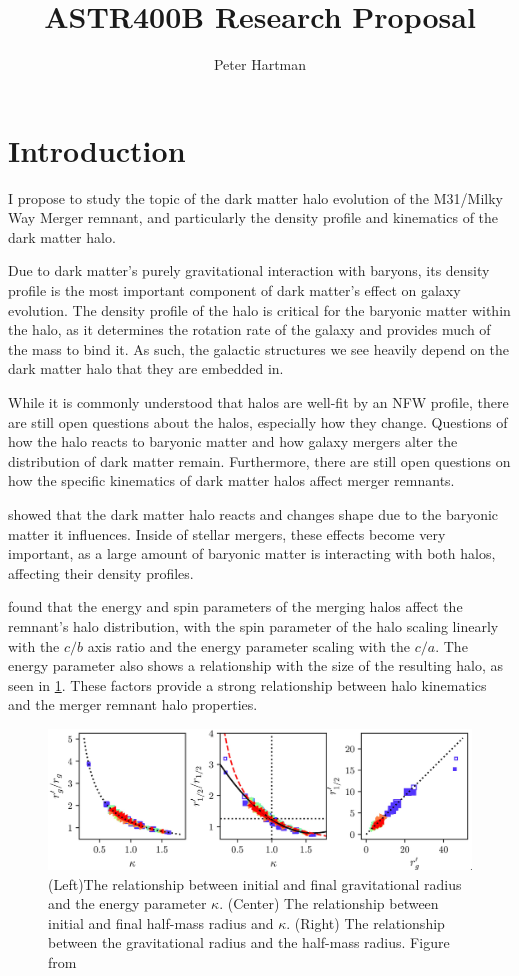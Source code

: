\documentclass[linenumbers]{aastex631}
\begin{document}
\title{ASTR400B Research Proposal}

\author{Peter Hartman}

\section{Introduction} \label{sec:intro}
I propose to study the topic of the dark matter halo evolution of the M31/Milky Way Merger remnant, and particularly the density profile and kinematics of the dark matter halo.

Due to dark matter's purely gravitational interaction with baryons, its density profile is the most important component of dark matter's effect on galaxy evolution. The density profile of the halo is critical for the baryonic matter within the halo, as it determines the rotation rate of the galaxy and provides much of the mass to bind it. As such, the galactic structures we see heavily depend on the dark matter halo that they are embedded in.

While it is commonly understood that halos are well-fit by an NFW profile, there are still open questions about the halos, especially how they change. Questions of how the halo reacts to baryonic matter and how galaxy mergers alter the distribution of dark matter remain. Furthermore, there are still open questions on how the specific kinematics of dark matter halos affect merger remnants.

\cite{Abadi} showed that the dark matter halo reacts and changes shape due to the baryonic matter it influences. Inside of stellar mergers, these effects become very important, as a large amount of baryonic matter is interacting with both halos, affecting their density profiles.

\cite{DrakosA} found that the energy and spin parameters of the merging halos affect the remnant's halo distribution, with the spin parameter of the halo scaling linearly with the $c/b$ axis ratio and the energy parameter scaling with the $c/a$. The energy parameter also shows a relationship with the size of the resulting halo, as seen in \ref{fig:1}. These factors provide a strong relationship between halo kinematics and the merger remnant halo properties.

\begin{figure}[h]
    \centering
    \includegraphics[width=\textwidth]{Drakos2019bFig7.jpg}
    \caption{(Left)The relationship between initial and final gravitational radius and the energy parameter $\kappa$. (Center) The relationship between initial and final half-mass radius and $\kappa$. (Right) The relationship between the gravitational radius and the half-mass radius. Figure from \cite{DrakosB}}
    \label{fig:1}
\end{figure}
\newpage
\end{document}
